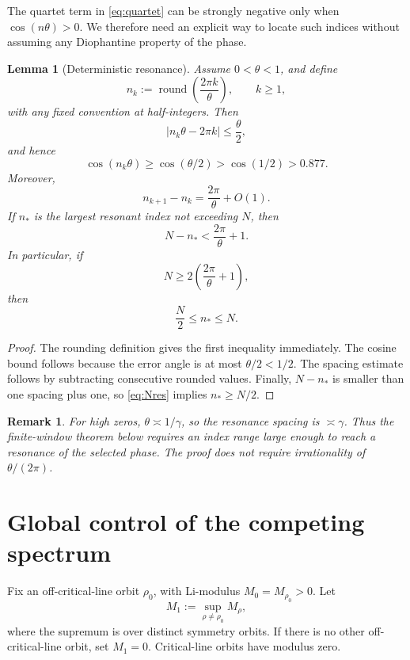 \documentclass[11pt]{article}
\newtheorem{lemma}[theorem]{Lemma}
\newtheorem{remark}[theorem]{Remark}
\begin{document}
The quartet term in \eqref{eq:quartet} can be strongly negative only when \(\cos(n\theta)>0\). We therefore need an explicit way to locate such indices without assuming any Diophantine property of the phase.

\begin{lemma}[Deterministic resonance]
Assume \(0<\theta<1\), and define
\[
n_k:=\operatorname{round}\left(\frac{2\pi k}{\theta}\right),\qquad k\ge1,
\]
with any fixed convention at half-integers. Then
\begin{equation}
|n_k\theta-2\pi k|\le\frac{\theta}{2},
\end{equation}
and hence
\begin{equation}
\cos(n_k\theta)\ge\cos(\theta/2)>\cos(1/2)>0.877.
\label{eq:resonance}
\end{equation}
Moreover,
\[
n_{k+1}-n_k=\frac{2\pi}{\theta}+O(1).
\]
If \(n_*\) is the largest resonant index not exceeding \(N\), then
\[
N-n_*<\frac{2\pi}{\theta}+1.
\]
In particular, if
\begin{equation}
N\ge2\left(\frac{2\pi}{\theta}+1\right),
\label{eq:Nres}
\end{equation}
then
\begin{equation}
\frac N2\le n_*\le N.
\label{eq:ncomparable}
\end{equation}
\end{lemma}

\begin{proof}
The rounding definition gives the first inequality immediately. The cosine bound follows because the error angle is at most \(\theta/2<1/2\). The spacing estimate follows by subtracting consecutive rounded values. Finally, \(N-n_*\) is smaller than one spacing plus one, so \eqref{eq:Nres} implies \(n_*\ge N/2\).
\end{proof}

\begin{remark}
For high zeros, \(\theta\asymp1/\gamma\), so the resonance spacing is \(\asymp\gamma\). Thus the finite-window theorem below requires an index range large enough to reach a resonance of the selected phase. The proof does not require irrationality of \(\theta/(2\pi)\).
\end{remark}

\section{Global control of the competing spectrum}

Fix an off-critical-line orbit \(\rho_0\), with Li-modulus \(M_0=M_{\rho_0}>0\). Let
\[
M_1:=\sup_{\rho\ne\rho_0}M_\rho,
\]
where the supremum is over distinct symmetry orbits. If there is no other off-critical-line orbit, set \(M_1=0\). Critical-line orbits have modulus zero.
\end{document}
